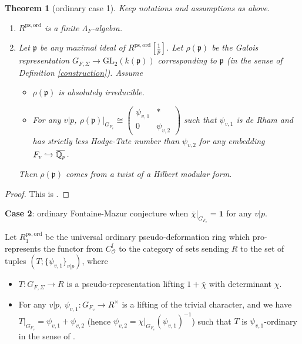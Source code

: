 \documentclass[a4paper, 12pt]{amsart}
\newtheorem{thm}{Theorem}[subsection]
\def\ps{\mathrm{ps}}
\def\ord{\mathrm{ord}}
\newcommand{\Q}{\mathbb{Q}}
\newcommand{\GL}{\mathrm{GL}}
\newcommand{\cO}{\mathcal{O}}
\newcommand{\cOf}{C_\cO^\mathrm{f}}
\newcommand{\kp}{\mathfrak{p}}
\newcommand{\overbar}[1]{\mkern 1.5mu\overline{\mkern-1.5mu#1\mkern-1.5mu}\mkern 1.5mu}
\begin{document}
    \begin{thm}[ordinary case 1] \label{ord1} Keep notations and assumptions as above.
    		\begin{enumerate}
    			\item $R^{\ps,\ord}$ is a finite $\Lambda_F$-algebra.
    			\item Let $\kp$ be any maximal ideal of $R^{\ps,\ord}[\frac{1}{p}]$. Let $\rho(\kp)$ be the Galois representation $G_{F,\Sigma}\to\GL_2(k(\kp))$ corresponding to $\kp$ (in the sense of Definition \ref{construction}). Assume 
    			\begin{itemize}
    				\item $\rho(\kp)$ is absolutely irreducible.
    				\item For any $v|p$, $\rho(\kp)|_{G_{F_v}}\cong\begin{pmatrix}\psi_{v,1} & *\\ 0 & \psi_{v,2}\end{pmatrix}$ such that $\psi_{v,1}$ is de Rham and has strictly less Hodge-Tate number than $\psi_{v,2}$ for any embedding $F_v\hookrightarrow \overbar{\Q_p}$.
    			\end{itemize}
    			Then $\rho(\kp)$ comes from a twist of a Hilbert modular form.
    		\end{enumerate}
    \end{thm}
    
    \begin{proof}
    	This is \cite[Theorem 5.1.1]{pan2022fontaine}.
    \end{proof}
    
    \textbf{Case 2}: ordinary Fontaine-Mazur conjecture when $ \bar{\chi}|_{G_{F_v}} = \mathbf{1}$ for any $v|p$.
    
    Let $R^{\ps,\ord}_1$ be the universal ordinary pseudo-deformation ring which pro-represents the functor from $\cOf$ to the category of sets sending $R$ to the set of tuples $(T;\{\psi_{v,1}\}_{v|p})$, where
    \begin{itemize}
    	\item $T:G_{F,\Sigma}\to R$ is a pseudo-representation lifting $1+\bar\chi$ with determinant $\chi$.
    	\item For any $v|p$, $\psi_{v,1}:G_{F_v}\to R^\times$ is a lifting of the trivial character, and we have
    	$T|_{G_{F_v}}=\psi_{v,1}+\psi_{v,2}$ (hence $\psi_{v,2}=\chi|_{G_{F_v}}(\psi_{v,1})^{-1}$) such that $T$ is $\psi_{v,1}$-ordinary in the sense of \cite[Definition 5.3.1]{pan2022fontaine}.
    \end{itemize}
    
\end{document}
